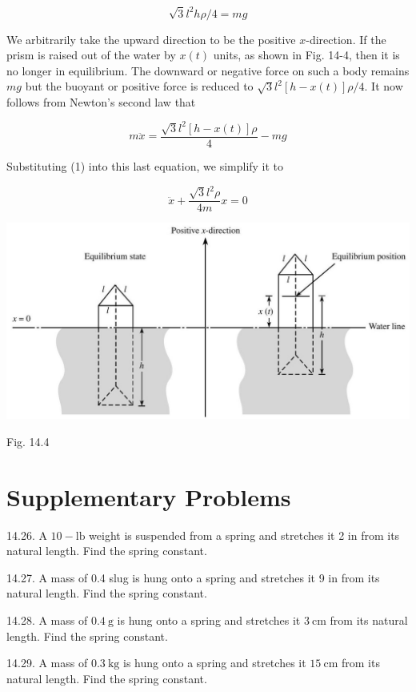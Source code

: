 \documentclass[10pt]{article}
\begin{document}
\begin{equation*}
\sqrt{3} l^{2} h \rho / 4=m g \tag{1}
\end{equation*}


We arbitrarily take the upward direction to be the positive $x$-direction. If the prism is raised out of the water by $x(t)$ units, as shown in Fig. 14-4, then it is no longer in equilibrium. The downward or negative force on such a body remains $m g$ but the buoyant or positive force is reduced to $\sqrt{3} l^{2}[h-x(t)] \rho / 4$. It now follows from Newton's second law that

$$
m \ddot{x}=\frac{\sqrt{3} l^{2}[h-x(t)] \rho}{4}-m g
$$

Substituting (1) into this last equation, we simplify it to

$$
\ddot{x}+\frac{\sqrt{3} l^{2} \rho}{4 m} x=0
$$

\begin{center}
\includegraphics[max width=\textwidth]{2024_04_03_5bb5b4275a64cb9887d1g-145}
\end{center}

Fig. 14.4

\section*{Supplementary Problems}
14.26. A $10-\mathrm{lb}$ weight is suspended from a spring and stretches it 2 in from its natural length. Find the spring constant.

14.27. A mass of 0.4 slug is hung onto a spring and stretches it 9 in from its natural length. Find the spring constant.

14.28. A mass of $0.4 \mathrm{~g}$ is hung onto a spring and stretches it $3 \mathrm{~cm}$ from its natural length. Find the spring constant.

14.29. A mass of $0.3 \mathrm{~kg}$ is hung onto a spring and stretches it $15 \mathrm{~cm}$ from its natural length. Find the spring constant.
\end{document}
